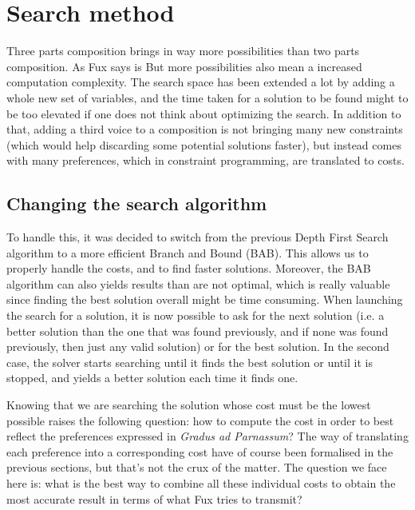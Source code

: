 \chapter{Search method}
Three parts composition brings in way more possibilities than two parts composition. As Fux says is %
But more possibilities also mean a increased computation complexity. The search space has been extended a lot by adding a whole new set of variables, and the time taken for a solution to be found might to be too elevated if one does not think about optimizing the search. In addition to that, adding a third voice to a composition is not bringing many new constraints (which would help discarding some potential solutions faster), but instead comes with many preferences, which in constraint programming, are translated to costs.

\section{Changing the search algorithm}

To handle this, it was decided to switch from the previous Depth First Search algorithm to a more efficient Branch and Bound (BAB). This allows us to properly handle the costs, and to find faster solutions. Moreover, the BAB algorithm can also yields results than are not optimal, which is really valuable since finding the best solution overall might be time consuming. When launching the search for a solution, it is now possible to ask for the next solution (i.e. a better solution than the one that was found previously, and if none was found previously, then just any valid solution) or for the best solution. In the second case, the solver starts searching until it finds the best solution or until it is stopped, and yields a better solution each time it finds one.

Knowing that we are searching the solution whose cost must be the lowest possible raises the following question: how to compute the cost in order to best reflect the preferences expressed in \textit{Gradus ad Parnassum}?
The way of translating each preference into a corresponding cost have of course been formalised in the previous sections, but that's not the crux of the matter. The question we face here is: what is the best way to combine all these individual costs to obtain the most accurate result in terms of what Fux tries to transmit?

